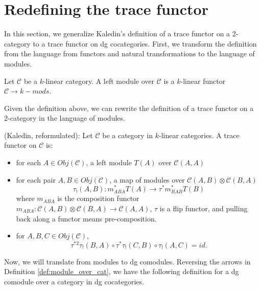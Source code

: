 \section{Redefining the trace functor} \label{sec:redefine_trace}
In this section, we generalize Kaledin's 
definition of a trace functor on a 2-category 
to a trace functor on dg cocategories.
First, we transform the definition from 
the language from functors and natural 
transformations to the language of modules.
%
\begin{defn} \label{def:module_over_cat}
Let $\mathcal{C}$ be a $k$-linear category. 
A left module over $\mathcal{C}$ is a 
$k$-linear functor 
$\mathcal{C} \to k-mods$.
\end{defn}
%
Given the definition above, we can rewrite 
the definition of a trace functor on a 
2-category in the language of modules.
%
\begin{defn} \label{def:trace_module}
(Kaledin, reformulated): Let $\mathcal{C}$ 
be a category in $k$-linear categories. 
A trace functor on $\mathcal{C}$ is:
\begin{itemize}
\item for each $A \in Obj(\mathcal{C})$, a 
left module $T(A)$ over $\mathcal{C}(A,A)$
%
\item for each pair $A, B \in Obj(\mathcal{C})$, a
map of modules over $\mathcal{C}(A,B) \otimes \mathcal{C}(B,A)$
$$\tau_!(A,B): m_{ABA}^*T(A) \to \tau^*m_{BAB}^*T(B)$$ 
where $m_{ABA}$ is the composition functor 
$m_{ABA}: \mathcal{C}(A,B) \otimes \mathcal{C}(B,A) \to 
\mathcal{C}(A,A)$, $\tau$ is a flip functor, and 
pulling back along a functor means pre-composition.
%
\item for $A,B,C \in Obj(\mathcal{C})$, 
$$\tau^{*2} \tau_!(B,A) \circ \tau^* \tau_!(C,B) \circ 
\tau_!(A,C) = id.$$
\end{itemize}
\end{defn}
%
Now, we will translate from modules to dg comodules. 
Reversing the arrows in Definition 
\ref{def:module_over_cat}, we have the following 
definition for a dg comodule over a category 
in dg cocategories.
%
